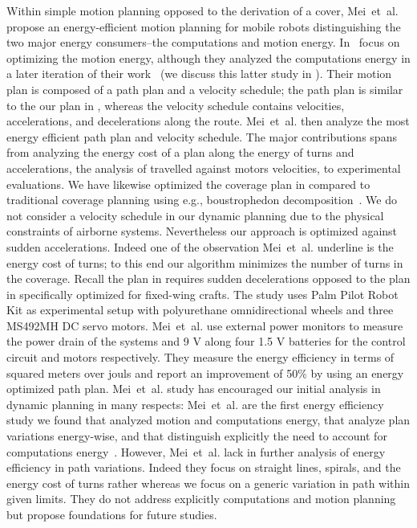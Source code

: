 Within simple motion planning opposed to the derivation of a cover, Mei~et~al. propose an energy-efficient motion planning for mobile robots distinguishing the two major energy consumers--the computations and motion energy. In~\citep{mei2004energy} focus on optimizing the motion energy, although they analyzed the computations energy in a later iteration of their work~\citep{mei2005case} (we discuss this latter study in ). Their motion plan is composed of a path plan and a velocity schedule; the path plan is similar to the our plan in , whereas the velocity schedule contains velocities, accelerations, and decelerations along the route. Mei~et~al. then analyze the most energy efficient path plan and velocity schedule. The major contributions spans from analyzing the energy cost of a plan along the energy of turns and accelerations, the analysis of travelled against motors velocities, to experimental evaluations. We have likewise optimized the coverage plan in  compared to traditional coverage planning using e.g., boustrophedon decomposition~\citep{lavalle2006planning}. We do not consider a velocity schedule in our dynamic planning due to the physical constraints of airborne systems. Nevertheless our approach is optimized against sudden accelerations. Indeed one of the observation Mei~et~al. underline is the energy cost of turns; to this end our algorithm minimizes the number of turns in  the coverage. Recall the plan in  requires sudden decelerations opposed to the plan in  specifically optimized for fixed-wing crafts.
The study uses Palm Pilot Robot Kit as experimental setup with polyurethane omnidirectional wheels and three MS492MH DC servo motors. Mei~et~al. use external power monitors to measure the power drain of the systems and 9 V along four 1.5 V batteries for the control circuit and motors respectively. They measure the energy efficiency in terms of squared meters over jouls and report an improvement of 50\% by using an energy optimized path plan. 
Mei~et~al. study has encouraged our initial analysis in dynamic planning in many respects: Mei~et~al. are the first energy efficiency study we found that analyzed motion and computations energy, that analyze plan variations energy-wise, and that distinguish explicitly the need to account for computations energy~\citep{mei2005case}. However, Mei~et~al. lack in further analysis of energy efficiency in path variations. Indeed they focus on straight lines, spirals, and the energy cost of turns rather whereas we focus on a generic variation in path within given limits. They do not address explicitly computations and motion planning but propose foundations for future studies.

